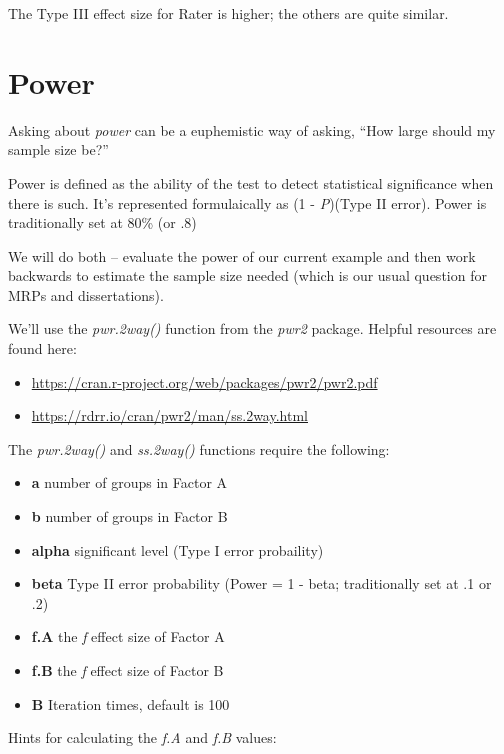 \documentclass[
  11pt,
]{book}
\providecommand{\tightlist}{%
  \setlength{\itemsep}{0pt}\setlength{\parskip}{0pt}}
\begin{document}
The Type III effect size for Rater is higher; the others are quite similar.

\hypertarget{power}{%
\section{Power}\label{power}}

Asking about \emph{power} can be a euphemistic way of asking, ``How large should my sample size be?''

Power is defined as the ability of the test to detect statistical significance when there is such. It's represented formulaically as (1 - \emph{P})(Type II error). Power is traditionally set at 80\% (or .8)

We will do both -- evaluate the power of our current example and then work backwards to estimate the sample size needed (which is our usual question for MRPs and dissertations).

We'll use the \emph{pwr.2way()} function from the \emph{pwr2} package.
Helpful resources are found here:

\begin{itemize}
\tightlist
\item
  \url{https://cran.r-project.org/web/packages/pwr2/pwr2.pdf}
\item
  \url{https://rdrr.io/cran/pwr2/man/ss.2way.html}
\end{itemize}

The \emph{pwr.2way()} and \emph{ss.2way()} functions require the following:

\begin{itemize}
\tightlist
\item
  \textbf{a} number of groups in Factor A
\item
  \textbf{b} number of groups in Factor B
\item
  \textbf{alpha} significant level (Type I error probaility)
\item
  \textbf{beta} Type II error probability (Power = 1 - beta; traditionally set at .1 or .2)
\item
  \textbf{f.A} the \emph{f} effect size of Factor A
\item
  \textbf{f.B} the \emph{f} effect size of Factor B
\item
  \textbf{B} Iteration times, default is 100
\end{itemize}

Hints for calculating the \emph{f.A} and \emph{f.B} values:
\end{document}
